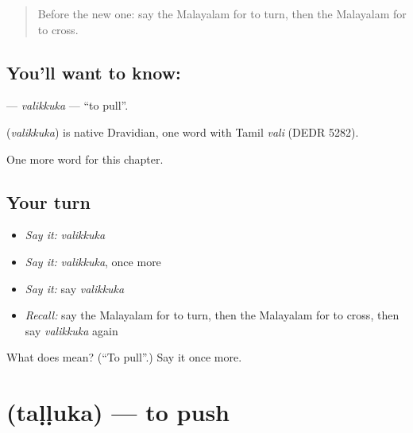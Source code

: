 \label{lesson:ML-C181-valikkuka}



\begin{quote}
Before the new one: say the Malayalam for to turn, then the Malayalam for to cross.
\end{quote}

\subsection*{You'll want to know: }
\textbf{} — \emph{valikkuka} — \textquotedblleft{}to pull\textquotedblright{}.

\begin{cousinweb}
\textbf{} (\emph{valikkuka}) is native Dravidian, one word with Tamil \emph{vali} (DEDR 5282).
\end{cousinweb}

\begin{grammarlens}[title={What you've built}]
One more word for this chapter.
\end{grammarlens}

\subsection*{Your turn}
\begin{itemize}
\raggedright
  \item \emph{Say it:} \emph{valikkuka}
  \item \emph{Say it:} \emph{valikkuka}, once more
  \item \emph{Say it:} say \emph{valikkuka}
  \item \emph{Recall:} say the Malayalam for to turn, then the Malayalam for to cross, then say \emph{valikkuka} again
\end{itemize}

\begin{tcolorbox}[breakable,colback=teal!4,colframe=teal!35!black,title={Before you move on}]
What does  mean? (\textquotedblleft{}To pull\textquotedblright{}.) Say it once more.
\end{tcolorbox}
\section[\texorpdfstring{\ml{തള്ളുക} (taḷḷuka)}{തള്ളുക (taḷḷuka)}]{ (taḷḷuka) — to push}

\label{lesson:ML-C181-talluka}



